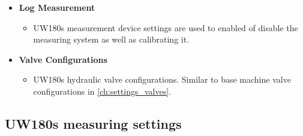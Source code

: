 \documentclass[12pt,a4paper,english]{uvmanual}
\begin{document}
\begin{itemize}
 \item \textbf{Log Measurement}
 \begin{itemize}
  \item UW180s measurement device settings are used to enabled of disable the measuring system as well as calibrating it.
 \end{itemize}

 \item \textbf{Valve Configurations}
 \begin{itemize}
  \item UW180s hydraulic valve configurations. Similar to base machine valve configurations in \autoref{ch:settings_valves}.
 \end{itemize}

\end{itemize}

\FloatBarrier
\subsection{UW180s measuring settings}\label{ch:settings_uw180s_meas}

\end{document}
